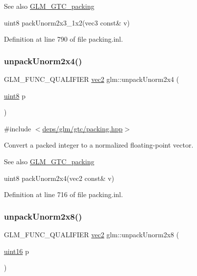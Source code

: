 \begin{DoxySeeAlso}{See also}
\hyperlink{group__gtc__packing}{G\+L\+M\+\_\+\+G\+T\+C\+\_\+packing} 

uint8 pack\+Unorm2x3\+\_\+1x2(vec3 const\& v) 
\end{DoxySeeAlso}


Definition at line 790 of file packing.\+inl.

\mbox{\label{group__gtc__packing_ga3afb0452954320f2d83fe6f38cb24147}} 
\subsubsection{\texorpdfstring{unpack\+Unorm2x4()}{unpackUnorm2x4()}}
{\footnotesize\ttfamily G\+L\+M\+\_\+\+F\+U\+N\+C\+\_\+\+Q\+U\+A\+L\+I\+F\+I\+ER \hyperlink{group__core__types_gaa1618f51db67eaa145db101d8c8431d8}{vec2} glm\+::unpack\+Unorm2x4 (\begin{DoxyParamCaption}\item[{\hyperlink{group__gtc__type__precision_ga1a7dcd8aac97cc8020817c94049deff2}{uint8}}]{p }\end{DoxyParamCaption})}



{\ttfamily \#include $<$\hyperlink{gtc_2packing_8hpp}{deps/glm/gtc/packing.\+hpp}$>$}

Convert a packed integer to a normalized floating-\/point vector.

\begin{DoxySeeAlso}{See also}
\hyperlink{group__gtc__packing}{G\+L\+M\+\_\+\+G\+T\+C\+\_\+packing} 

uint8 pack\+Unorm2x4(vec2 const\& v) 
\end{DoxySeeAlso}


Definition at line 716 of file packing.\+inl.

\mbox{\label{group__gtc__packing_ga96ce0c24339ee676e28a027fffd1edf6}} 
\subsubsection{\texorpdfstring{unpack\+Unorm2x8()}{unpackUnorm2x8()}}
{\footnotesize\ttfamily G\+L\+M\+\_\+\+F\+U\+N\+C\+\_\+\+Q\+U\+A\+L\+I\+F\+I\+ER \hyperlink{group__core__types_gaa1618f51db67eaa145db101d8c8431d8}{vec2} glm\+::unpack\+Unorm2x8 (\begin{DoxyParamCaption}\item[{\hyperlink{group__gtc__type__precision_gad8c2939e1fdd8e5828b31d95c52255d5}{uint16}}]{p }\end{DoxyParamCaption})}



